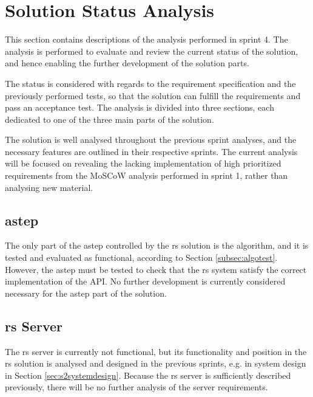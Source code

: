 \section{Solution Status Analysis}
This section contains descriptions of the analysis performed in sprint 4.
The analysis is performed to evaluate and review the current status of the solution, and hence enabling the further development of the solution parts.

The status is considered with regards to the requirement specification and the previously performed tests, so that the solution can fulfill the requirements and pass an acceptance test.
The analysis is divided into three sections, each dedicated to one of the three main parts of the solution.

The solution is well analysed throughout the previous sprint analyses, and the necessary features are outlined in their respective sprints.
The current analysis will be focused on revealing the lacking implementation of high prioritized requirements from the MoSCoW analysis performed in sprint 1, rather than analysing new material.


\subsection{\gls{astep}}
The only part of the \gls{astep} controlled by the \gls{rs} solution is the algorithm, and it is tested and evaluated as functional, according to Section \ref{subsec:algotest}. 
However, the \gls{astep} must be tested to check that the \gls{rs} system satisfy the correct implementation of the API.
No further development is currently considered necessary for the \gls{astep} part of the solution.


\subsection{\gls{rs} Server}
The \gls{rs} server is currently not functional, but its functionality and position in the \gls{rs} solution is analysed and designed in the previous sprints, e.g. in system design in Section \ref{sec:s2systemdesign}. Because the \gls{rs} server is sufficiently described previously, there will be no further analysis of the server requirements.

